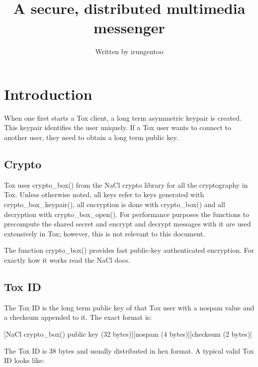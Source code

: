 \documentclass{tox}
\begin{document}
\title{A secure, distributed multimedia messenger}


\author{Written by irungentoo} %

\maketitle

\tableofcontents
\clearpage

\section{Introduction}

When one first starts a Tox client, a long term asymmetric keypair is created. 
This keypair identifies the user uniquely. If a Tox user wants to connect to 
another user, they need to obtain a long term public key. 

\subsection{Crypto}

Tox uses crypto\_box() from the NaCl crypto library for all the cryptography in 
Tox. Unless otherwise noted, all keys refer to keys generated with 
crypto\_box\_keypair(), all encryption is done with crypto\_box() and all 
decryption with crypto\_box\_open(). For performance purposes the functions to 
precompute the shared secret and encrypt and decrypt messages with it are used 
extensively in Tox; however, this is not relevant to this document.

The function crypto\_box() provides fast public-key authenticated encryption. 
For exactly how it works read the NaCl docs.

\subsection{Tox ID}

The Tox ID is the long term public key of that Tox user with a nospam value and 
a checksum appended to it. The exact format is:

[NaCl crypto\_box() public key (32 bytes)][nospam (4 bytes)][checksum (2 bytes)]

The Tox ID is 38 bytes and usually distributed in hex format. A typical valid 
Tox ID looks like:
\end{document}
